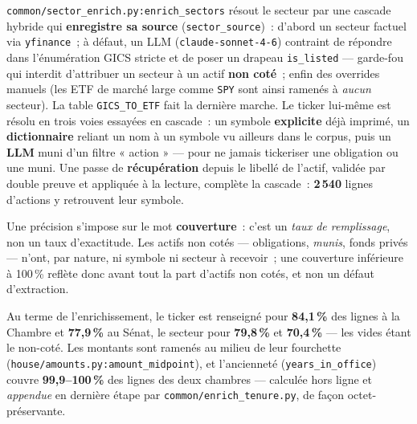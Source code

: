 \documentclass[11pt,a4paper]{article}
\newcommand{\co}[1]{\texttt{\small #1}}
\begin{document}
\co{common/sector_enrich.py:enrich_sectors} résout le secteur par une cascade hybride qui \textbf{enregistre
sa source} (\co{sector_source})~: d'abord un secteur factuel via \co{yfinance}~; à défaut, un LLM
(\co{claude-sonnet-4-6}) contraint de répondre dans l'énumération GICS stricte et de poser un drapeau
\co{is_listed} — garde-fou qui interdit d'attribuer un secteur à un actif \textbf{non coté}~; enfin des
overrides manuels (les ETF de marché large comme \co{SPY} sont ainsi ramenés à \emph{aucun} secteur). La
table \co{GICS_TO_ETF} fait la dernière marche. Le ticker lui-même est résolu en trois voies essayées en
cascade~: un symbole \textbf{explicite} déjà imprimé, un \textbf{dictionnaire} reliant un nom à un symbole
vu ailleurs dans le corpus, puis un \textbf{LLM} muni d'un filtre « action » — pour ne jamais tickeriser une
obligation ou une muni. Une passe de \textbf{récupération} depuis le libellé de l'actif, validée par double
preuve et appliquée à la lecture, complète la cascade~: \textbf{2\,540} lignes d'actions y retrouvent leur
symbole.

Une précision s'impose sur le mot \textbf{couverture}~: c'est un \emph{taux de remplissage}, non un taux
d'exactitude. Les actifs non cotés — obligations, \emph{munis}, fonds privés — n'ont, par nature, ni symbole
ni secteur à recevoir~; une couverture inférieure à 100\,\% reflète donc avant tout la part d'actifs non
cotés, et non un défaut d'extraction.

Au terme de l'enrichissement, le ticker est renseigné pour \textbf{84,1\,\%} des lignes à la Chambre et
\textbf{77,9\,\%} au Sénat, le secteur pour \textbf{79,8\,\%} et \textbf{70,4\,\%} — les vides étant le
non-coté. Les montants sont ramenés au milieu de leur fourchette (\co{house/amounts.py:amount_midpoint}),
et l'ancienneté (\co{years_in_office}) couvre \textbf{99,9--100\,\%} des lignes des deux chambres —
calculée hors ligne et \emph{appendue} en dernière étape par \co{common/enrich_tenure.py}, de façon
octet-préservante.
\end{document}
